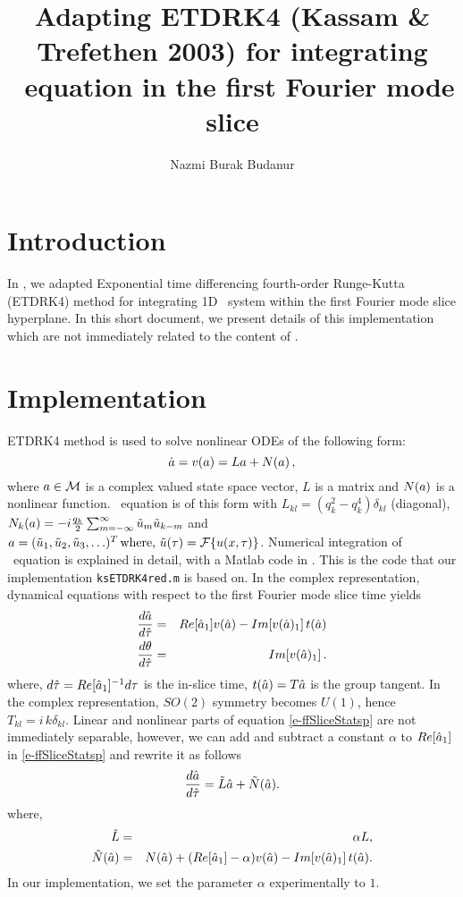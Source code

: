 \documentclass[10pt,a4paper]{report}
\title{Adapting ETDRK4 (Kassam \& Trefethen 2003) for integrating 
	   \KS\ equation in the first Fourier mode slice}
\author{Nazmi Burak Budanur}
\begin{document}
\maketitle

\section*{Introduction}
In \BCDS, we adapted Exponential time differencing fourth-order Runge-Kutta
(ETDRK4) method for integrating 1D \KS\ system within the first Fourier mode
slice hyperplane. In this short document, we present details of this
implementation which are not immediately related to the content of \BCDS.

\section*{Implementation}

ETDRK4 method is used to solve nonlinear ODEs of the following form:
\begin{equation}
	\dot{a} = v (a) = L a + N(a) \, ,
	\label{e-ODE}
\end{equation}	
where $a \in {\cal M}$ is a complex valued state space vector, $L$ is a matrix
and $N(a)$ is a nonlinear function. \KS\ equation is of this form with
$L_{kl} = (q_k^2 - q_k^4) \delta_{kl}$ (diagonal), $N_k (a) = - i \frac{q_k}{2}
\sum_{m=-\infty}^{\infty} \tilde{u}_m \tilde{u}_{k - m}$ and $a = (\tilde{u}_1, \tilde{u}_2, \tilde{u}_3,
\ldots)^T\,\mbox{where, } \tilde{u} (\tau) = {\cal F} \{u(x, \tau)\} $. Numerical
integration of \KS\ equation is explained in detail, with a Matlab code in 
\KasTre . This is the code that our implementation \texttt{ksETDRK4red.m} is
based on. In the complex representation, dynamical equations with respect to
the first Fourier mode slice time yields
\begin{eqnarray}
	\frac{d \hat{a}}{d \hat{\tau}}  &=& Re[\hat{a}_1] v(\hat{a})
	- Im[v(\hat{a})_1] \, t(\hat{a}) \label{e-ffSliceStatsp}
	\\
	\frac{d \theta}{d \hat{\tau}} &=& Im[v(\hat{a})_1] \label{e-ffSlicePhase}
	\,.
\end{eqnarray}
where, $d \hat{\tau} = Re[\hat{a}_1]^{-1} d \tau$ is the in-slice time,
$t(\hat{a}) = T \hat{a} $ is the group tangent. In the complex
representation, $SO(2)$ symmetry becomes $U(1)$, hence $T_{kl} = i \,
k\delta_{kl}$. Linear and nonlinear parts of equation \ref{e-ffSliceStatsp} are
not immediately separable, however, we can add and subtract a constant $\alpha$
to $Re[\hat{a}_1]$ in \ref{e-ffSliceStatsp} and rewrite it as follows
\begin{equation}
	\frac{d \hat{a}}{d \hat{\tau}} = \tilde{L} \hat{a} + \tilde{N}(\hat{a}) .
\end{equation}
where, 
\begin{eqnarray}
	\tilde{L} &=& \alpha L ,
	  \\
	\tilde{N}(\hat{a}) &=& N(\hat{a}) + (Re[\hat{a}_1] - \alpha) v (\hat{a})
	  			- Im[v(\hat{a})_1] \, t(\hat{a}) .
\end{eqnarray}	
In our implementation, we set the parameter $\alpha$ experimentally to $1$.
\end{document}
